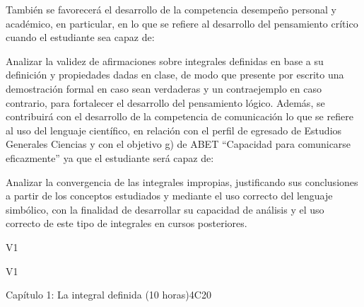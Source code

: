 \begin{syllabus}
\begin{goals}
También se favorecerá el desarrollo de la competencia desempeño personal y académico, en particular, en lo que se refiere al desarrollo del pensamiento crítico cuando el estudiante sea capaz de:
\item Analizar la validez de afirmaciones sobre integrales definidas en base a su definición y propiedades dadas en clase, de modo que presente por escrito una demostración formal en caso sean verdaderas y un contraejemplo en caso contrario, para fortalecer el desarrollo del pensamiento lógico.
Además, se contribuirá con el desarrollo de la competencia de comunicación lo que se refiere al uso del lenguaje científico, en relación con el perfil de egresado de Estudios Generales Ciencias y con el objetivo g) de ABET ``Capacidad para comunicarse eficazmente'' ya que el estudiante será capaz de:
\item Analizar la convergencia de las integrales impropias, justificando sus conclusiones a partir de los conceptos estudiados y mediante el uso correcto del lenguaje simbólico, con la finalidad de desarrollar su capacidad de análisis y el uso correcto de este tipo de integrales en cursos posteriores.
\end{goals}

\begin{outcomes}{V1}
\item {}
\item {}
\end{outcomes}

\begin{competences}{V1}
    \item {}
\end{competences}

\begin{unit}{Capítulo 1: La integral definida (10 horas)}{}{}{4}{C20}

% 


\end{unit}
\end{syllabus}
